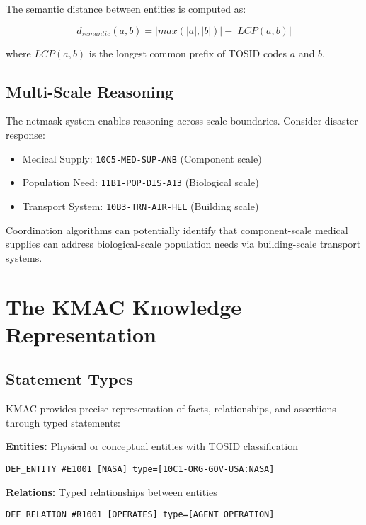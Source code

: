\documentclass[conference]{IEEEtran}
\begin{document}
The semantic distance between entities is computed as:

\begin{equation}
d_{semantic}(a,b) = |max(|a|,|b|)| - |LCP(a,b)|
\end{equation}

where $LCP(a,b)$ is the longest common prefix of TOSID codes $a$ and $b$.

\subsection{Multi-Scale Reasoning}

The netmask system enables reasoning across scale boundaries. Consider disaster response:

\begin{itemize}
\item Medical Supply: \texttt{10C5-MED-SUP-ANB} (Component scale)
\item Population Need: \texttt{11B1-POP-DIS-A13} (Biological scale)  
\item Transport System: \texttt{10B3-TRN-AIR-HEL} (Building scale)
\end{itemize}

Coordination algorithms can potentially identify that component-scale medical supplies can address biological-scale population needs via building-scale transport systems.

\section{The KMAC Knowledge Representation}

\subsection{Statement Types}

KMAC provides precise representation of facts, relationships, and assertions through typed statements:

\textbf{Entities:} Physical or conceptual entities with TOSID classification
\begin{lstlisting}
DEF_ENTITY #E1001 [NASA] type=[10C1-ORG-GOV-USA:NASA]
\end{lstlisting}

\textbf{Relations:} Typed relationships between entities
\begin{lstlisting}
DEF_RELATION #R1001 [OPERATES] type=[AGENT_OPERATION]
\end{lstlisting}
\end{document}
